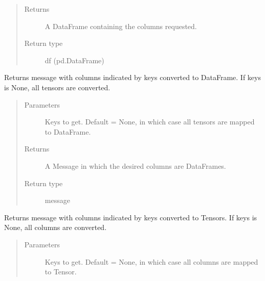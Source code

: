 \documentclass[letterpaper,10pt,english]{sphinxmanual}
\begin{document}
\begin{fulllineitems}
\begin{fulllineitems}
\begin{quote}
\begin{description}
\item[{Returns}] \leavevmode
A DataFrame containing the columns requested.

\item[{Return type}] \leavevmode
df (pd.DataFrame)

\end{description}\end{quote}

\end{fulllineitems}


\begin{fulllineitems}
\label{\detokenize{Fireworks:Fireworks.core.message.Message.to_dataframe}}
Returns message with columns indicated by keys converted to DataFrame. If keys is None, all tensors are converted.
\begin{quote}\begin{description}
\item[{Parameters}] \leavevmode
{} \textendash{} Keys to get. Default = None, in which case all tensors are mapped to DataFrame.

\item[{Returns}] \leavevmode
A Message in which the desired columns are DataFrames.

\item[{Return type}] \leavevmode
message

\end{description}\end{quote}

\end{fulllineitems}


\begin{fulllineitems}
\label{\detokenize{Fireworks:Fireworks.core.message.Message.to_tensors}}
Returns message with columns indicated by keys converted to Tensors. If keys is None, all columns are converted.
\begin{quote}\begin{description}
\item[{Parameters}] \leavevmode
{} \textendash{} Keys to get. Default = None, in which case all columns are mapped to Tensor.


\end{description}
\end{quote}
\end{fulllineitems}
\end{fulllineitems}
\end{document}
